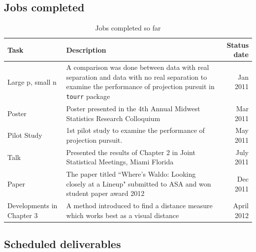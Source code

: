 \documentclass[12]{report}
\begin{document}
\subsection{Jobs completed}

\begin{table}[hbtp]
\caption{Jobs completed so far}
\centering 
\begin{tabular}{|l|p{10cm}|r|} 
\hline
Task &  Description & Status date\\ %
\hline
Large p, small n & A comparison was done between data with real separation and data with no real separation to examine the performance of projection pursuit in \texttt{tourr} package \vspace{.1in} & Jan 2011 \\
Poster & Poster presented in the 4th Annual Midwest Statistics Research Colloquium\vspace{.1in} & Mar 2011 \\ 
Pilot Study & 1st pilot study to examine the performance of projection pursuit.  \vspace{.1in} & May 2011\\ 
Talk & Presented the results of Chapter 2 in Joint Statistical Meetings, Miami Florida \vspace{.1in} & July 2011 \\
Paper & The paper titled ``Where's Waldo: Looking closely at a Lineup" submitted to ASA and won student paper award 2012 \vspace{.1in} & Dec 2011 \\

Developments in Chapter 3 & A method introduced to find a distance measure which works best as a visual distance \vspace{.1in} & April 2012\\
\hline
\end{tabular}
\label{tbl:cjob}
\end{table}	

\subsection{Scheduled deliverables}
\end{document}
